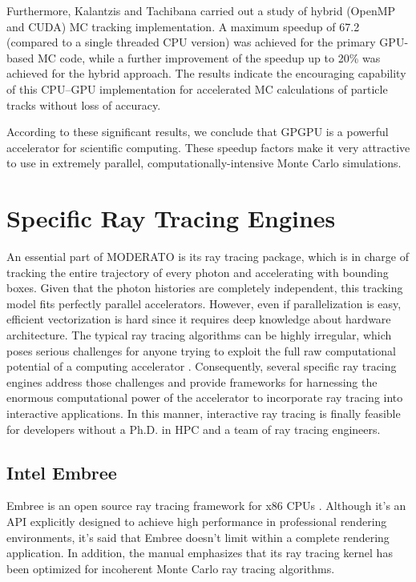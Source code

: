 Furthermore, Kalantzis and Tachibana \citep{tachibana2014accelerated} carried out a study of hybrid (OpenMP and CUDA) MC tracking implementation. A maximum speedup of 67.2 (compared to a single threaded CPU version) was achieved for the primary GPU-based MC code, while a further improvement of the speedup up to 20\% was achieved for the hybrid approach. The results indicate the encouraging capability of this CPU–GPU implementation for accelerated MC calculations of particle tracks without loss of accuracy.

According to these significant results, we conclude that GPGPU is a powerful accelerator for scientific computing. These speedup factors make it very attractive to use in extremely parallel, computationally-intensive Monte Carlo simulations.


\section{Specific Ray Tracing Engines}
An essential part of MODERATO is its ray tracing package, which is in charge of tracking the entire trajectory of every photon and accelerating with bounding boxes. Given that the photon histories are completely independent, this tracking model fits perfectly parallel accelerators. However, even if parallelization is easy, efficient vectorization is hard since it requires deep knowledge about hardware architecture. The typical ray tracing algorithms can be highly irregular, which poses serious challenges for anyone trying to exploit the full raw computational potential of a computing accelerator \citep{Reference6}. Consequently, several specific ray tracing engines address those challenges and provide frameworks for harnessing the enormous computational power of the accelerator to incorporate ray tracing into interactive applications. In this manner, interactive ray tracing is finally feasible for developers without a Ph.D. in HPC and a team of ray tracing engineers.


\subsection{Intel Embree}
Embree is an open source ray tracing framework for x86 CPUs \citep{wald2014embree}. Although it's an API explicitly designed to achieve high performance in professional rendering environments, it's said that Embree doesn't limit within a complete rendering application. In addition, the manual \citep{embree} emphasizes that its ray tracing kernel has been optimized for incoherent Monte Carlo ray tracing algorithms.

